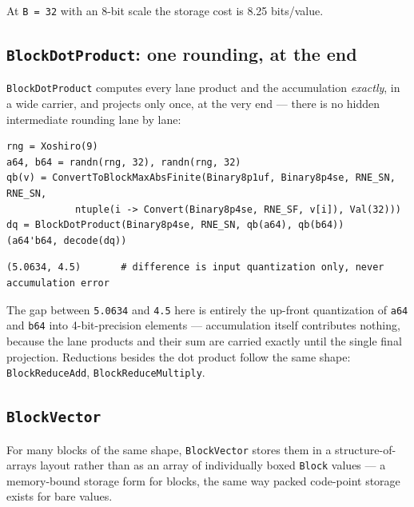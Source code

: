 At \texttt{B = 32} with an 8-bit scale the storage cost is 8.25 bits/value.



\subsection{\texttt{BlockDotProduct}: one rounding, at the end}



\label{17638104271940170310}{}


\texttt{BlockDotProduct} computes every lane product and the accumulation \emph{exactly}, in a wide carrier, and projects only once, at the very end — there is no hidden intermediate rounding lane by lane:




\nopagebreak[4]
\begin{minipage}{\linewidth}
\begin{verbatim}
rng = Xoshiro(9)
a64, b64 = randn(rng, 32), randn(rng, 32)
qb(v) = ConvertToBlockMaxAbsFinite(Binary8p1uf, Binary8p4se, RNE_SN, RNE_SN,
            ntuple(i -> Convert(Binary8p4se, RNE_SF, v[i]), Val(32)))
dq = BlockDotProduct(Binary8p4se, RNE_SN, qb(a64), qb(b64))
(a64'b64, decode(dq))
\end{verbatim}




\begin{verbatim}
(5.0634, 4.5)       # difference is input quantization only, never accumulation error
\end{verbatim}
\end{minipage}




The gap between \texttt{5.0634} and \texttt{4.5} here is entirely the up-front quantization of \texttt{a64} and \texttt{b64} into 4-bit-precision elements — accumulation itself contributes nothing, because the lane products and their sum are carried exactly until the single final projection. Reductions besides the dot product follow the same shape: \texttt{BlockReduceAdd}, \texttt{BlockReduceMultiply}.



\subsection{\texttt{BlockVector}}



\label{13615094720265409582}{}


For many blocks of the same shape, \texttt{BlockVector} stores them in a structure-of-arrays layout rather than as an array of individually boxed \texttt{Block} values — a memory-bound storage form for blocks, the same way packed code-point storage exists for bare values.



